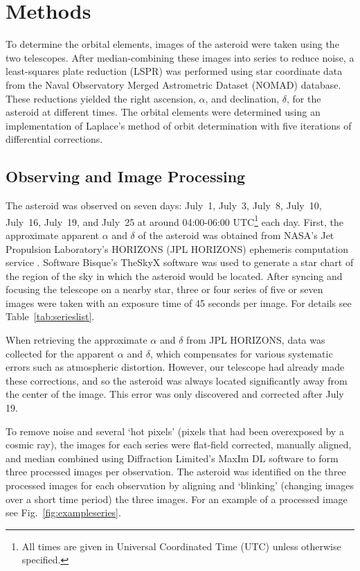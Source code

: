\documentclass[12pt,journal,compsoc]{IEEEtran}
\begin{document}
\section{Methods}
To determine the orbital elements, images of the asteroid were taken using the two telescopes.
After median-combining these images into series to reduce noise, a least-squares plate reduction (LSPR) was performed using star coordinate data from the Naval Observatory Merged Astrometric Dataset (NOMAD) database. These reductions yielded the right ascension, $\alpha$, and declination, $\delta$, for the asteroid at different times.
The orbital elements were determined using an implementation of Laplace's method of orbit determination with five iterations of differential corrections.

\subsection{Observing and Image Processing}
The asteroid was observed on seven days: July~1, July~3, July~8, July~10, July~16, July~19, and July~25 at around 04:00-06:00 UTC\footnote{All times are given in Universal Coordinated Time (UTC) unless otherwise specified.} each day.
First, the approximate apparent $\alpha$ and $\delta$ of the asteroid was obtained from NASA's Jet Propulsion Laboratory's HORIZONS (JPL HORIZONS) ephemeris computation service .
Software Bisque's TheSkyX software was used to generate a star chart of the region of the sky in which the asteroid would be located.
After syncing and focusing the telescope on a nearby star, three or four series of five or seven images were taken with an exposure time of 45 seconds per image. For details see Table~\ref{tab:serieslist}.

When retrieving the approximate $\alpha$ and $\delta$ from JPL HORIZONS, data was collected for the apparent $\alpha$ and $\delta$, which compensates for various systematic errors such as atmospheric distortion.
However, our telescope had already made these corrections, and so the asteroid was always located significantly away from the center of the image.
This error was only discovered and corrected after July 19.

To remove noise and several `hot pixels' (pixels that had been overexposed by a cosmic ray), the images for each series were flat-field corrected, manually aligned, and median combined using Diffraction Limited's MaxIm DL software to form three processed images per observation.
The asteroid was identified on the three processed images for each observation by aligning and `blinking' (changing images over a short time period) the three images.
For an example of a processed image see Fig.~\ref{fig:exampleseries}.
\end{document}
